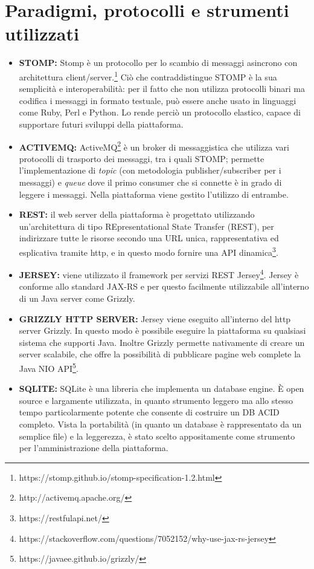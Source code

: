 \section{Paradigmi, protocolli e strumenti utilizzati}

\begin{itemize}
	\item \textbf{STOMP:} Stomp è un protocollo per lo scambio di messaggi asincrono con architettura client/server.\footnote{https://stomp.github.io/stomp-specification-1.2.html}
	Ciò che contraddistingue STOMP è la sua semplicità e interoperabilità: per il fatto che non utilizza
	protocolli binari ma codifica i messaggi in formato testuale, può essere anche usato in
	linguaggi come Ruby, Perl e Python. Lo rende perciò un protocollo elastico, capace di supportare futuri sviluppi della piattaforma.
	\item \textbf{ACTIVEMQ:} ActiveMQ\footnote{http://activemq.apache.org/} è un broker di messaggistica che utilizza vari protocolli di trasporto dei messaggi, tra i quali STOMP; permette l’implementazione di \textit{topic} (con metodologia  publisher/subscriber per i messaggi) e \textit{queue} dove il primo consumer che si connette è in grado di leggere i messaggi. Nella piattaforma viene gestito l'utilizzo di entrambe.
	\item \textbf{REST:} il web server della piattaforma è progettato utilizzando un’architettura di tipo REpresentational State Transfer (REST), per indirizzare tutte le risorse secondo una URL unica, rappresentativa ed esplicativa tramite http, e in questo modo fornire una API dinamica\footnote{https://restfulapi.net/}.
	\item \textbf{JERSEY:} viene utilizzato il framework per servizi REST Jersey\footnote{https://stackoverflow.com/questions/7052152/why-use-jax-rs-jersey}. Jersey è conforme allo standard JAX-RS e per questo facilmente utilizzabile all'interno di un Java server come Grizzly.
	\item \textbf{GRIZZLY HTTP SERVER:} Jersey viene eseguito all’interno del http server Grizzly. In questo modo è possibile eseguire la piattaforma su qualsiasi sistema che supporti Java. Inoltre Grizzly permette nativamente di creare un server scalabile, che offre la possibilità di pubblicare pagine web complete la Java NIO API\footnote{https://javaee.github.io/grizzly/}.
	\item \textbf{SQLITE:} SQLite è una libreria che implementa un database engine. È open source e largamente utilizzata, in quanto strumento leggero ma allo stesso tempo particolarmente potente che consente di costruire un DB ACID completo. Vista la portabilità (in quanto un database è rappresentato da un semplice file) e la leggerezza, è stato scelto appositamente come strumento per l’amministrazione della piattaforma.

\end{itemize}
